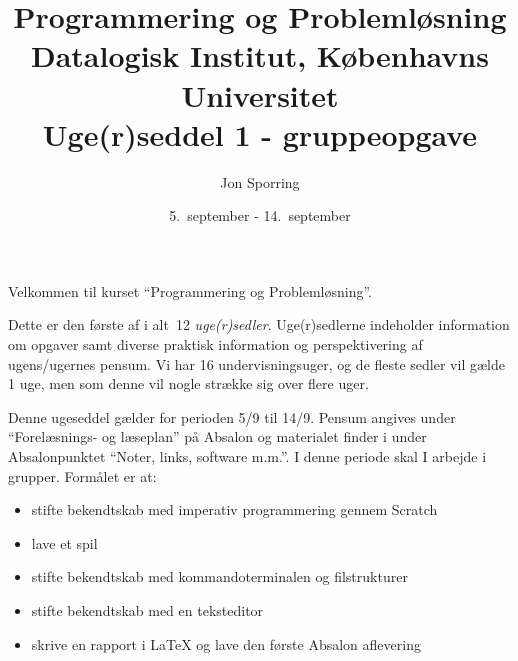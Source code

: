 \documentclass[a4paper,12pt]{article}
\title{Programmering og Problemløsning\\Datalogisk Institut,
  Københavns Universitet\\Uge(r)seddel 1 - gruppeopgave}
\author{Jon Sporring}
\date{5.\ september - 14.\ september}
\begin{document}
\maketitle

Velkommen til kurset ``Programmering og Problemløsning''.

Dette er den første af i alt~12 \emph{uge(r)sedler}. Uge(r)sedlerne indeholder information om opgaver samt diverse praktisk information og perspektivering af ugens/ugernes pensum. Vi har 16 undervisningsuger, og de fleste sedler vil gælde 1 uge, men som denne vil nogle strække sig over flere uger.

Denne ugeseddel gælder for perioden 5/9 til 14/9. Pensum angives under "`Forelæsnings- og læseplan"' på Absalon og materialet finder i under Absalonpunktet "`Noter, links, software m.m."'.  I denne periode skal I arbejde i grupper. Formålet er at:
\begin{itemize}
\item stifte bekendtskab med imperativ programmering gennem Scratch
\item lave et spil
\item stifte bekendtskab med kommandoterminalen og filstrukturer
\item stifte bekendtskab med en teksteditor
\item skrive en rapport i LaTeX og lave den første Absalon aflevering
\end{itemize}
\end{document}
